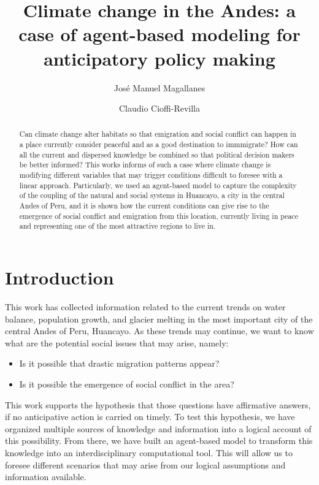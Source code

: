 \documentclass{article}
\title{Climate change in the Andes: a case of agent-based modeling for anticipatory policy making}
\author[1]{\normalsize Jos\'{e} Manuel Magallanes}
\author[2]{\normalsize Claudio Cioffi-Revilla}
\affil[1,2]{\small  Center for Social Complexity\\
George Mason University \\
\url{{jmagalla,ccioffi}@gmu.edu}}
\affil[1]{\small eScience Institute and Evans School of Public Policy\\
University of Washington\\
\url{magajm@uw.edu}}
\affil[1]{\small Department of Social Sciences\\
Pontificia Universidad Catolica del Peru\\
\url{jmagallanes@pucp.edu.pe}}
\begin{document}


\maketitle

\begin{abstract}
Can climate change alter habitats so that emigration and social conflict can happen in a place currently consider peaceful and as a good destination to immmigrate? How can all the current and dispersed knowledge be combined so that political decision makers be better informed? This works informs of such a case where climate change is modifying different variables that may trigger conditions difficult to foresee with a linear approach. Particularly, we used an agent-based model to capture the complexity of the coupling of the natural and social systems in Huancayo, a city in the central Andes of Peru, and it is shown how the current conditions can give rise to the emergence of social conflict and emigration from this location, currently living in peace and representing one of the most attractive regions to live in.

\end{abstract}


\section{Introduction}

This work has collected information related to the current trends on water balance, population growth, and glacier melting in the most important city of the central Andes of Peru, Huancayo. As these trends may continue, we want to know what are the potential social issues that may arise, namely:
\begin{itemize}
\item Is it possible that drastic migration patterns appear?
\item Is it possible the emergence of social conflict in the area?
\end{itemize}

This work supports the hypothesis that those questions have affirmative answers, if no anticipative action is carried on timely. To test this hypothesis, we have organized multiple sources of knowledge and information into  a logical account of this possibility. From there, we have built an agent-based model to transform this knowledge into an interdisciplinary computational tool. This will allow us to foresee different scenarios that may arise from our logical assumptions and information available. 
\end{document}
